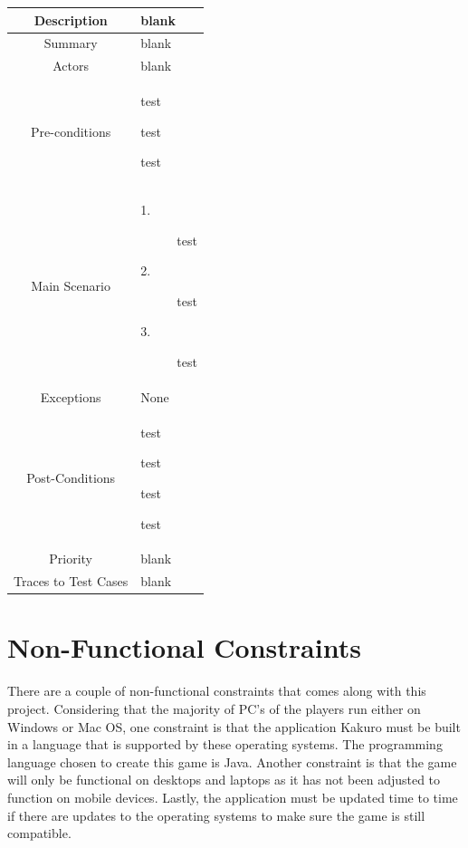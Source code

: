 \documentclass[12pt]{article}
\begin{document}
\begin{table}[htbp]
\begin{center}
\begin{tabular}{| c | m{10cm} |}
\hline
\cellcolor{lightgray}Description & blank \\
\hline
\cellcolor{lightgray}Summary & blank \\
\hline
\cellcolor{lightgray}Actors & blank \\
\hline
\cellcolor{lightgray}Pre-conditions &
\begin{description}[font=$\bullet$~\normalfont\scshape]
\item test
\item test 
\item test
\end{description}\\
\hline
\cellcolor{lightgray}Main Scenario & 
\begin{description}
\item [1.]test
\item [2.]test
\item [3.]test
\end{description}\\
\hline
\cellcolor{lightgray}Exceptions & None \\
\hline
\cellcolor{lightgray}Post-Conditions & 
\begin{description}[font=$\bullet$~\normalfont\scshape]
\item test
\item test
\item test
\item test
\end{description}\\
\hline
\cellcolor{lightgray}Priority & blank \\
\hline
\cellcolor{lightgray}Traces to Test Cases & blank \\
\hline
\end{tabular}
\end{center}
\end{table}

\clearpage

\section{Non-Functional Constraints}

\hspace{\parindent}  There are a couple of non-functional constraints that comes along with this project. Considering that the majority of PC’s of the players run either on Windows or Mac OS, one constraint is that the application Kakuro must be built in a language that is supported by these operating systems. The programming language chosen to create this game is Java. Another constraint is that the game will only be functional on desktops and laptops as it has not been adjusted to function on mobile devices. Lastly, the application must be updated time to time if there are updates to the operating systems to make sure the game is still compatible.
\end{document}

